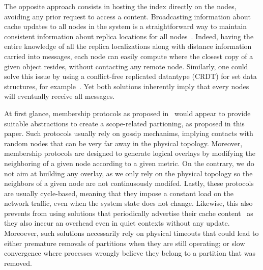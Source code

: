 The opposite approach consists in hosting the index directly on the nodes, avoiding any prior request to access a content.   
Broadcasting information about cache updates to all nodes in the system is a straightforward way to maintain consistent information about replica locations for all nodes~\cite{nlsr}. Indeed, having the entire knowledge of all the replica localizations along with distance information carried into messages, each node can easily compute where the closest copy of a given object resides, without contacting any remote node.
Similarly, one could solve this issue by using a conflict-free replicated datantype (CRDT) for set data structures, for example~\cite{shapiro2011crdts}. Yet both solutions inherently imply that every nodes will eventually receive all messages. 


At first glance, membership protocols as proposed in~\cite{t-man} would appear to provide suitable abstractions to create a scope-related partioning, as proposed in this paper. Such protocols usually rely on gossip mechanims, implying contacts with random nodes that can be very far away in the physical topology. Moreover, membership protocols are designed to generate logical overlays by modifying the neighboring of a given node according to a given metric. 
On the contrary, we do not aim at building any overlay, as we only rely on the physical topology so the neighbors of a given node are not continusously modifed. Lastly, these protocols are usually cycle-based, meaning that they impose a constant load on the network traffic, even when the system state does not change. Likewise, this also prevents from using solutions that periodically advertise their cache content~\cite{hemmati2015namebased, garcia-lopez} as they also inccur an overhead even in quiet contexts without any update. 
Moreoever, such solutions necessarily rely on physical timeouts that could lead to either premature removals of partitions when they are still operating; or slow convergence where processes wrongly believe they belong to a partition that was removed. 




